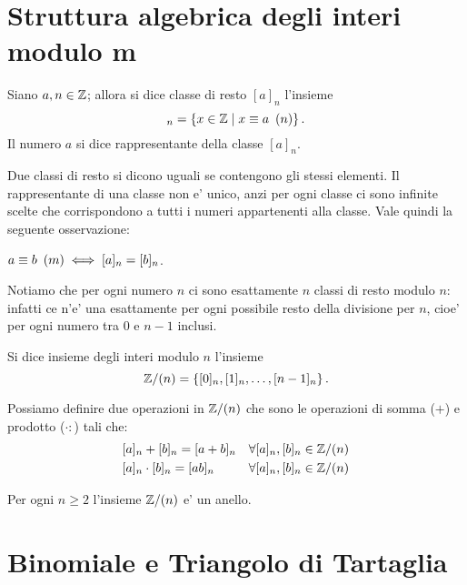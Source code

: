 \section{Struttura algebrica degli interi modulo m}

\begin{definition}
    Siano $a, n \in \mathbb{Z}$; allora si dice classe di resto $[a]_n$ l'insieme 
    \begin{equation}
        [a]_n = \left\{x \in \Z \mid x \equiv a \Mod{n}\right\}.
    \end{equation}
    Il numero $a$ si dice rappresentante della classe $[a]_n$.
\end{definition}

Due classi di resto si dicono uguali se contengono gli stessi elementi.
Il rappresentante di una classe non e' unico, anzi per ogni classe ci sono infinite scelte che corrispondono a tutti i numeri appartenenti alla classe. Vale quindi la seguente osservazione:
\begin{remark}
    $a \equiv b \ \left(m\right) \iff [a]_n = [b]_n$.
\end{remark}

Notiamo che per ogni numero $n$ ci sono esattamente $n$ classi di resto modulo $n$: infatti ce n'e' una esattamente per ogni possibile resto della divisione per $n$, cioe' per ogni numero tra $0$ e $n-1$ inclusi.

\begin{definition}
    Si dice insieme degli interi modulo $n$ l'insieme
    \begin{equation}
        \mathbb{Z}/(n) = \left\{ [0]_n, [1]_n, \dots, [n-1]_n\right\}.
    \end{equation}
\end{definition}

Possiamo definire due operazioni in $\mathbb{Z}/(n)$ che sono le operazioni di somma ($+$) e prodotto ($\cdot :$) tali che:
\begin{align}
    &[a]_n + [b]_n = [a+b]_n    &\forall [a]_n, [b]_n \in \mathbb{Z}/(n)\\
    &[a]_n \cdot [b]_n = [ab]_n &\forall [a]_n, [b]_n \in \mathbb{Z}/(n)
\end{align}

\begin{proposition}
    Per ogni $n \geq 2$ l'insieme $\mathbb{Z}/(n)$ e' un anello.
\end{proposition}

\section{Binomiale e Triangolo di Tartaglia}

